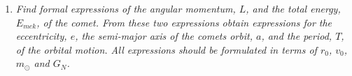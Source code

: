 \begin{example}
\begin{enumerate}
\begin{equation}
			\begin{split}
				\frac{d}{dt}\bigg(|\vec{r}|^2m_C\dot{\theta}\bigg)=0&\Rightarrow m_C|\vec{r}|^2\dot{\theta}=const\equiv L\\
				&\Rightarrow \dot{\theta}=\frac{L}{m_Cr^2},\\
			\end{split}
			\label{r3}
		\end{equation} 
		where $r=|\vec{r}|$. Using equation \eqref{r3} in equation \eqref{r4}
		\begin{equation}
			\frac{dA}{dt}=\frac{L}{2m_C}=\frac{m_C\vec{r}\times \vec{v}}{2m_C}=\frac{r_0v_0}{2}.
			\label{r15}
		\end{equation} 
		
		\item \emph{Find formal expressions of the angular momentum, $L$, and the total energy, $E_{mek}$, of the comet. From these two expressions obtain expressions for the eccentricity, $e$, the semi-major axis of the comets orbit, $a$, and the period, $T$, of the orbital motion. All expressions should be formulated in terms of $r_0$, $v_0$, $m_\odot$ and $G_N$.}
		

\end{enumerate}
\end{example}

